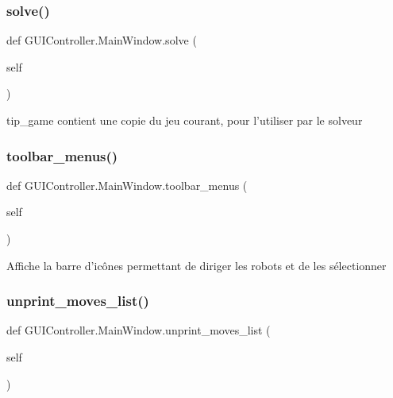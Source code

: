 \subsubsection{\texorpdfstring{solve()}{solve()}}
{\footnotesize\ttfamily def G\+U\+I\+Controller.\+Main\+Window.\+solve (\begin{DoxyParamCaption}\item[{}]{self }\end{DoxyParamCaption})}

\begin{DoxyVerb}tip_game contient une copie du jeu courant, pour l'utiliser par le solveur\end{DoxyVerb}
 \mbox{\label{classGUIController_1_1MainWindow_a483d135e809887f19c4aa90eed85f05e}} 
\subsubsection{\texorpdfstring{toolbar\+\_\+menus()}{toolbar\_menus()}}
{\footnotesize\ttfamily def G\+U\+I\+Controller.\+Main\+Window.\+toolbar\+\_\+menus (\begin{DoxyParamCaption}\item[{}]{self }\end{DoxyParamCaption})}

\begin{DoxyVerb}Affiche la barre d'icônes permettant de diriger les robots et de les sélectionner\end{DoxyVerb}
 \mbox{\label{classGUIController_1_1MainWindow_a4de267c46dbd5902cbade13eabe50f24}} 
\subsubsection{\texorpdfstring{unprint\+\_\+moves\+\_\+list()}{unprint\_moves\_list()}}
{\footnotesize\ttfamily def G\+U\+I\+Controller.\+Main\+Window.\+unprint\+\_\+moves\+\_\+list (\begin{DoxyParamCaption}\item[{}]{self }\end{DoxyParamCaption})}

